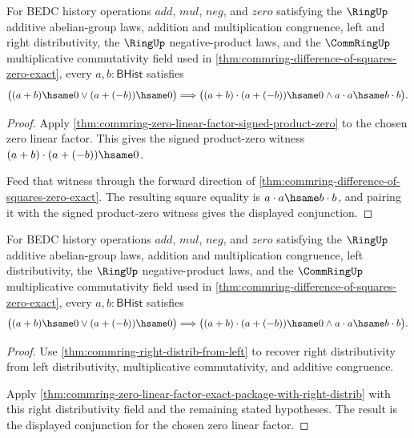 \begin{theorem}
\label{thm:commring-zero-linear-factor-exact-package-with-right-distrib}
For BEDC history operations $add$, $mul$, $neg$, and $zero$ satisfying the
$\RingUp$ additive abelian-group laws, addition and multiplication congruence,
left and right distributivity, the $\RingUp$ negative-product laws, and the
$\CommRingUp$ multiplicative commutativity field used in
\autoref{thm:commring-difference-of-squares-zero-exact}, every
$a,b : \mathsf{BHist}$ satisfies
$$
\bigl((a+b)\hsame0 \lor (a+(-b))\hsame0\bigr)
\Longrightarrow
\bigl((a+b)\cdot(a+(-b))\hsame0 \land a\cdot a\hsame b\cdot b\bigr).
$$
\end{theorem}
\begin{proof}
Apply \autoref{thm:commring-zero-linear-factor-signed-product-zero} to the
chosen zero linear factor. This gives the signed product-zero witness
$(a+b)\cdot(a+(-b))\hsame0$.

Feed that witness through the forward direction of
\autoref{thm:commring-difference-of-squares-zero-exact}. The resulting
square equality is $a\cdot a\hsame b\cdot b$, and pairing it with the
signed product-zero witness gives the displayed conjunction.
\end{proof}

\begin{theorem}
\label{thm:commring-zero-linear-factor-exact-package}
For BEDC history operations $add$, $mul$, $neg$, and $zero$ satisfying the
$\RingUp$ additive abelian-group laws, addition and multiplication congruence,
left distributivity, the $\RingUp$ negative-product laws, and the
$\CommRingUp$ multiplicative commutativity field used in
\autoref{thm:commring-difference-of-squares-zero-exact}, every
$a,b : \mathsf{BHist}$ satisfies
$$
\bigl((a+b)\hsame0 \lor (a+(-b))\hsame0\bigr)
\Longrightarrow
\bigl((a+b)\cdot(a+(-b))\hsame0 \land a\cdot a\hsame b\cdot b\bigr).
$$
\end{theorem}
\begin{proof}
Use \autoref{thm:commring-right-distrib-from-left} to recover right
distributivity from left distributivity, multiplicative commutativity, and
additive congruence.

Apply
\autoref{thm:commring-zero-linear-factor-exact-package-with-right-distrib} with
this right distributivity field and the remaining stated hypotheses. The
result is the displayed conjunction for the chosen zero linear factor.
\end{proof}


